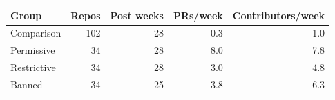 \begin{tabular}{lrrrr}
\toprule
Group & Repos & Post weeks & PRs/week & Contributors/week \\
\midrule
Comparison & 102 & 28 & 0.3 & 1.0 \\
Permissive & 34 & 28 & 8.0 & 7.8 \\
Restrictive & 34 & 28 & 3.0 & 4.8 \\
Banned & 34 & 25 & 3.8 & 6.3 \\
\bottomrule
\end{tabular}
